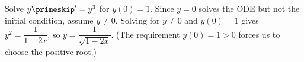 {Solve $y\primeskip' = y^3$ for $y(0)=1$.}
{Since $y=0$ solves the ODE but not the initial condition, assume $y\neq 0$. Solving for $y\neq 0$ and $y(0)=1$ gives $y^2 = \dfrac{1}{1-2x}$, so $y = \dfrac{1}{\sqrt{1-2x}}$. (The requirement $y(0)=1>0$ forces us to choose the positive root.)}